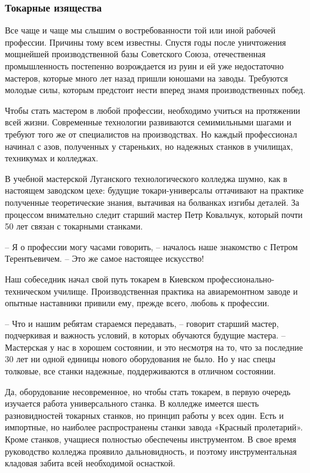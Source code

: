\subsubsection{Токарные изящества}

Все чаще и чаще мы слышим о востребованности той или иной рабочей профессии.
Причины тому всем известны. Спустя годы после уничтожения мощнейшей
производственной базы Советского Союза, отечественная промышленность постепенно
возрождается из руин и ей уже недостаточно мастеров, которые много лет назад
пришли юношами на заводы. Требуются молодые силы, которым предстоит нести
вперед знамя производственных побед.

Чтобы стать мастером в любой профессии, необходимо учиться на протяжении всей
жизни. Современные технологии развиваются семимильными шагами и требуют того же
от специалистов на производствах. Но каждый профессионал начинал с азов,
полученных у стареньких, но надежных станков в училищах, техникумах и
колледжах. 

В учебной мастерской Луганского технологического колледжа шумно, как в
настоящем заводском цехе: будущие токари-универсалы оттачивают на практике
полученные теоретические знания, вытачивая на болванках изгибы деталей. За
процессом внимательно следит старший мастер Петр Ковальчук, который почти 50
лет связан с токарными станками.

– Я о профессии могу часами говорить, – началось наше знакомство с Петром Терентьевичем. – Это же самое настоящее искусство! 

Наш собеседник начал свой путь токарем в Киевском профессионально-техническом
училище. Производственная практика на авиаремонтном заводе и опытные наставники
привили ему, прежде всего, любовь к профессии. 

– Что и нашим ребятам стараемся передавать, – говорит старший мастер,
подчеркивая и важность условий, в которых обучаются будущие мастера. –
Мастерская у нас в хорошем состоянии, и это несмотря на то, что за последние 30
лет ни одной единицы нового оборудования не было. Но у нас спецы толковые, все
станки надежные, поддерживаются в отличном состоянии. 

Да, оборудование несовременное, но чтобы стать токарем, в первую очередь
изучается работа универсального станка. В колледже имеется шесть разновидностей
токарных станков, но принцип работы у всех один. Есть и импортные, но наиболее
распространены станки завода «Красный пролетарий». Кроме станков, учащиеся
полностью обеспечены инструментом. В свое время руководство колледжа проявило
дальновидность, и поэтому инструментальная кладовая забита всей необходимой
оснасткой. 

